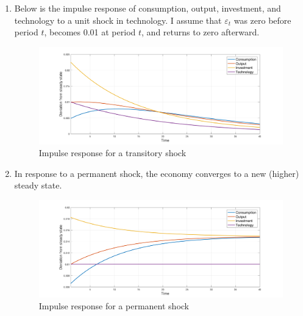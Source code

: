 \documentclass[11pt]{amsart}
\begin{document}
\begin{enumerate}[label = (\alph*)]
    \item Below is the impulse response of consumption, output, investment, and technology to a unit shock in technology. I assume that $\varepsilon_t$ was zero before period $t$, becomes 0.01 at period $t$, and returns to zero afterward. 
    \begin{figure}[H]
    	\centering
    	\includegraphics[width=1\textwidth]{5b_Minki.png}
    	\caption{Impulse response for a transitory shock}
    \end{figure}
    
    \item In response to a permanent shock, the economy converges to a new (higher) steady state. 
    \begin{figure}[H]
    	\centering
    	\includegraphics[width=1\textwidth]{5c_Minki.png}
    	\caption{Impulse response for a permanent shock}
    \end{figure}


\end{enumerate}
\end{document}
